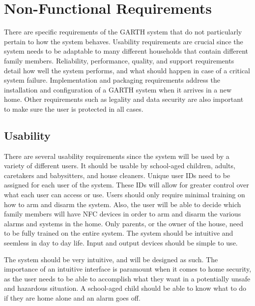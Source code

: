 \documentclass{report}
\begin{document}
\chapter{Non-Functional Requirements}
\label{ch:non-functional_requirements}
There are specific requirements of the GARTH system that do not particularly
pertain to how the system behaves. Usability requirements are crucial since the
system needs to be adaptable to many different households that contain
different family members. Reliability, performance, quality, and support
requirements detail how well the system performs, and what should happen in
case of a critical system failure. Implementation and packaging requirements
address the installation and configuration of a GARTH system when it arrives in
a new home. Other requirements such as legality and data security are also
important to make sure the user is protected in all cases.


\section{Usability}
There are several usability requirements since the system will be used by a
variety of different users. It should be usable by school-aged children,
adults, caretakers and babysitters, and house cleaners. Unique user IDs need to
be assigned for each user of the system. These IDs will allow for greater
control over what each user can access or use. Users should only require
minimal training on how to arm and disarm the system. Also, the user will be
able to decide which family members will have NFC devices in order to arm and
disarm the various alarms and systems in the home.  Only parents, or the owner
of the house, need to be fully trained on the entire system. The system should
be intuitive and seemless in day to day life. Input and output devices should
be simple to use.

The system should be very intuitive, and will be designed as such. The
importance of an intuitive interface is paramount when it comes to home
security, as the user needs to be able to accomplish what they want in a
potentially unsafe and hazardous situation. A school-aged child should be able to
know what to do if they are home alone and an alarm goes off.
\end{document}
